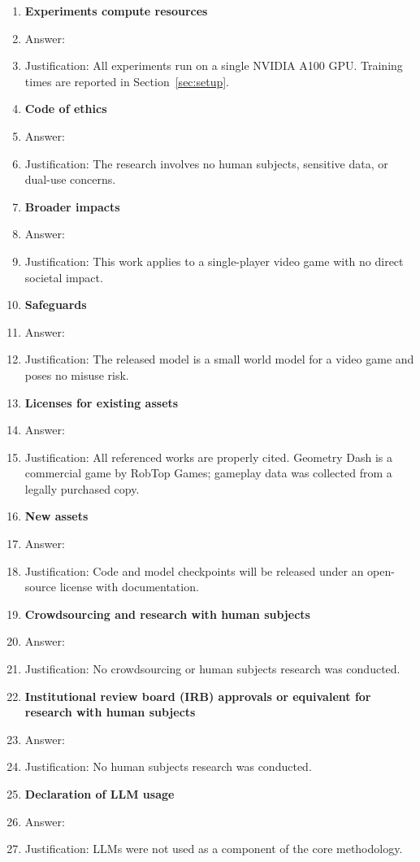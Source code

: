 \begin{enumerate}
\item {\bf Experiments compute resources}
    \item[] Answer: \answerYes{}
    \item[] Justification: All experiments run on a single NVIDIA A100 GPU. Training times are reported in Section~\ref{sec:setup}.

\item {\bf Code of ethics}
    \item[] Answer: \answerYes{}
    \item[] Justification: The research involves no human subjects, sensitive data, or dual-use concerns.

\item {\bf Broader impacts}
    \item[] Answer: \answerNA{}
    \item[] Justification: This work applies to a single-player video game with no direct societal impact.

\item {\bf Safeguards}
    \item[] Answer: \answerNA{}
    \item[] Justification: The released model is a small world model for a video game and poses no misuse risk.

\item {\bf Licenses for existing assets}
    \item[] Answer: \answerYes{}
    \item[] Justification: All referenced works are properly cited. Geometry Dash is a commercial game by RobTop Games; gameplay data was collected from a legally purchased copy.

\item {\bf New assets}
    \item[] Answer: \answerYes{}
    \item[] Justification: Code and model checkpoints will be released under an open-source license with documentation.

\item {\bf Crowdsourcing and research with human subjects}
    \item[] Answer: \answerNA{}
    \item[] Justification: No crowdsourcing or human subjects research was conducted.

\item {\bf Institutional review board (IRB) approvals or equivalent for research with human subjects}
    \item[] Answer: \answerNA{}
    \item[] Justification: No human subjects research was conducted.

\item {\bf Declaration of LLM usage}
    \item[] Answer: \answerNA{}
    \item[] Justification: LLMs were not used as a component of the core methodology.

\end{enumerate}

